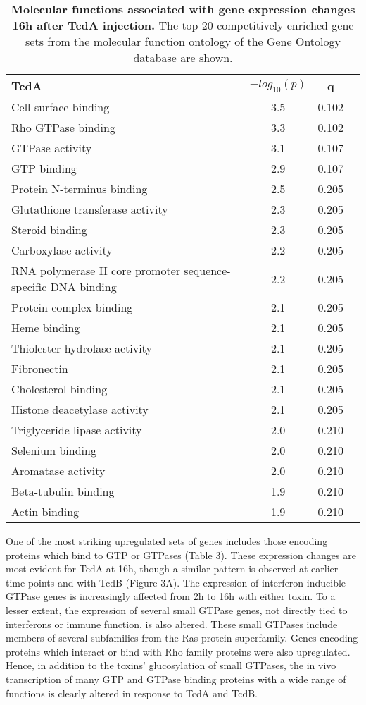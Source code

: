 \begin{table}[h!]
\begin{center}
\begin{tabular}{ l c c c }
TcdA & $-log_{10}(p)$ & q \\ \hline
Cell surface binding & 3.5 & 0.102 \\
Rho GTPase binding & 3.3 & 0.102 \\
GTPase activity & 3.1 & 0.107 \\
GTP binding & 2.9 & 0.107 \\
Protein N-terminus binding & 2.5 & 0.205 \\
Glutathione transferase activity & 2.3 & 0.205 \\
Steroid binding & 2.3 & 0.205 \\
Carboxylase activity & 2.2 & 0.205 \\
RNA polymerase II core promoter sequence-specific DNA binding & 2.2 & 0.205 \\
Protein complex binding & 2.1 & 0.205 \\
Heme binding & 2.1 & 0.205 \\
Thiolester hydrolase activity & 2.1 & 0.205 \\
Fibronectin & 2.1 & 0.205 \\
Cholesterol binding & 2.1 & 0.205 \\
Histone deacetylase activity & 2.1 & 0.205 \\
Triglyceride lipase activity & 2.0 & 0.210 \\
Selenium binding & 2.0 & 0.210 \\
Aromatase activity & 2.0 & 0.210 \\
Beta-tubulin binding & 1.9 & 0.210 \\
Actin binding & 1.9 & 0.210 \\
\end{tabular}
\caption[Molecular functions associated with gene expression changes 16h after TcdA injection]{
 \textbf{Molecular functions associated with gene expression changes 16h after TcdA injection.}
The top 20 competitively enriched gene sets from the molecular function ontology of the Gene Ontology database are shown.}
\label{ini:table3}
\end{center}
\end{table}



One of the most striking upregulated sets of genes includes those encoding proteins which bind to GTP or GTPases (Table 3). These expression changes are most evident for TcdA at 16h, though a similar pattern is observed at earlier time points and with TcdB (Figure 3A). The expression of interferon-inducible GTPase genes is increasingly affected from 2h to 16h with either toxin. To a lesser extent, the expression of several small GTPase genes, not directly tied to interferons or immune function, is also altered. These small GTPases include members of several subfamilies from the Ras protein superfamily. Genes encoding proteins which interact or bind with Rho family proteins were also upregulated. Hence, in addition to the toxins’ glucosylation of small GTPases, the in vivo transcription of many GTP and GTPase binding proteins with a wide range of functions is clearly altered in response to TcdA and TcdB.

